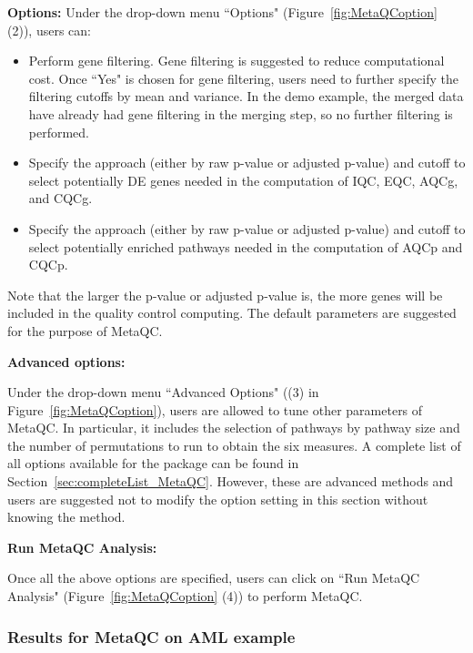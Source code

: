 \begin{steps}
\item \textbf{Options:}
Under the drop-down menu ``Options" (Figure~\ref{fig:MetaQCoption} {\color{red}(2)}),
users can:

\begin{itemize}
\item Perform gene filtering. Gene filtering is suggested to reduce computational cost. Once ``Yes" is chosen for gene filtering, 
users need to further specify the filtering cutoffs by mean and variance. 
In the demo example, 
the merged data have already had gene filtering in the merging step, so no further filtering is performed. 
\item Specify the approach (either by raw p-value or adjusted p-value) and cutoff to select potentially DE genes needed in the computation of IQC, EQC, AQCg, and CQCg.
\item Specify the approach (either by raw p-value or adjusted p-value) and cutoff to select potentially enriched pathways needed in the computation of AQCp and CQCp.
\end{itemize}
Note that the larger the p-value or adjusted p-value is, 
the more genes will be included in the quality control computing.
The default parameters are suggested for the purpose of MetaQC.

\item \textbf{Advanced options:}



Under the drop-down menu ``Advanced Options" ({\color{red}(3)} in Figure~\ref{fig:MetaQCoption}), users are allowed to tune other parameters of MetaQC.
In particular, it includes the selection of pathways by pathway size and the number of permutations to run to obtain the six measures. 
A complete list of all options available for the package can be found in Section~\ref{sec:completeList_MetaQC}. 
However, these are advanced methods and users are suggested not to modify the option setting in this section without knowing the method. 

\item \textbf{Run MetaQC Analysis:}

Once all the above options are specified, users can click on ``Run MetaQC Analysis" (Figure~\ref{fig:MetaQCoption}  {\color{red}(4)}) to 
perform MetaQC. 

\end{steps}



\subsubsection{Results for MetaQC on AML example}

